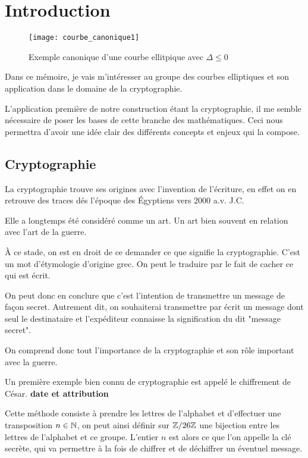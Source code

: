\chapter{Introduction}

\begin{figure}[h]
    \centering
    \texttt{[image: courbe\_canonique1]}
    \caption{Exemple canonique d'une courbe ellitpique avec $\Delta \le 0$}
    \label{fig:courbe_canonique1}
\end{figure}
Dans ce mémoire, je vais m'intéresser au groupe des courbes elliptiques et son application dans le
domaine de la cryptographie.

L'application première de notre construction étant la cryptographie, il me semble nécessaire de
poser les bases de cette branche des mathématiques. Ceci nous permettra d'avoir une idée clair
des différents concepts et enjeux qui la compose.

\section{Cryptographie}

La cryptographie trouve ses origines avec l'invention de l'écriture, en effet on en
retrouve des traces dés l'époque des Égyptiens vers 2000 a.v. J.C.

Elle a longtemps été considéré comme un art. Un art bien souvent en relation avec l'art de
la guerre.

À ce stade, on est en droit de ce demander ce que signifie la cryptographie. C'est un mot
d'étymologie d'origine grec. On peut le traduire par le fait de cacher ce qui est écrit.

On peut donc en conclure que c'est l'intention de transmettre un message de façon secret.
Autrement dit, on souhaiterai transmettre par écrit un message dont seul le destinataire
et l'expéditeur connaisse la signification du dit "message secret". 

On comprend donc tout l'importance de la cryptographie et son rôle important avec la
guerre.

Un première exemple bien connu de cryptographie est appelé le chiffrement de César. 
\textbf{date et attribution}

Cette méthode consiste à
prendre les lettres de l'alphabet et d'effectuer une transposition $n \in \mathbb{N}$, on peut
ainsi définir sur $\mathbb{Z} / 26\mathbb{Z}$ une bijection entre les lettres de l'alphabet et ce groupe.
L'entier $n$ est alors ce que l'on appelle la clé secrète, qui va permettre à la fois de
chiffrer et de déchiffrer un éventuel message.

